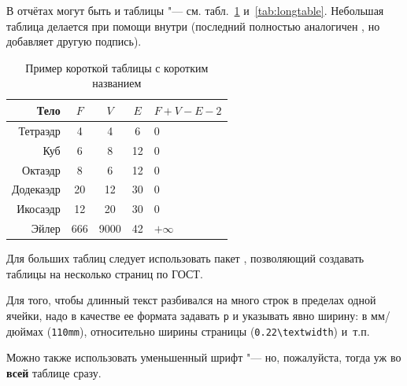 В отчётах могут быть и таблицы "--- см. табл.~\ref{tab:tabular} и~\ref{tab:longtable}.
Небольшая таблица делается при помощи  внутри  (последний
полностью аналогичен , но добавляет другую подпись).

\begin{table}[ht]
  \caption{Пример короткой таблицы с коротким названием}
  \begin{tabular}{|r|c|c|c|l|}
  \hline
  Тело      & $F$ & $V$  & $E$ & $F+V-E-2$ \\
  \hline
  Тетраэдр  & 4   & 4    & 6   & 0         \\
  Куб       & 6   & 8    & 12  & 0         \\
  Октаэдр   & 8   & 6    & 12  & 0         \\
  Додекаэдр & 20  & 12   & 30  & 0         \\
  Икосаэдр  & 12  & 20   & 30  & 0         \\
  \hline
  Эйлер     & 666 & 9000 & 42  & $+\infty$ \\
  \hline
  \end{tabular}
  \label{tab:tabular}
\end{table}

Для больших таблиц следует использовать пакет , позволяющий создавать
таблицы на несколько страниц по ГОСТ.

Для того, чтобы длинный текст разбивался на много строк в пределах одной ячейки, надо в
качестве ее формата задавать \texttt{p} и указывать явно ширину: в мм/дюймах
(\texttt{110mm}), относительно ширины страницы (\texttt{0.22\textbackslash textwidth})
и~т.п.

Можно также использовать уменьшенный шрифт "--- но, пожалуйста, тогда уж во \textbf{всей}
таблице сразу.

